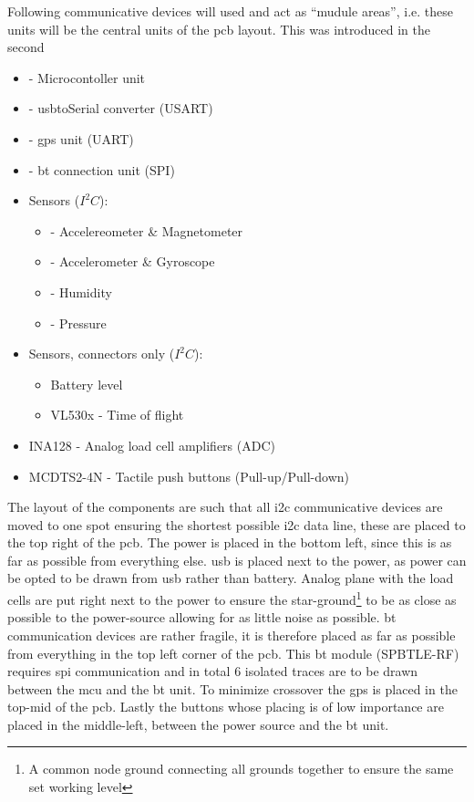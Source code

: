 Following communicative devices will used and act as ``mudule areas'', i.e. these units will be the central units of the \gls{pcb} layout. This was introduced in the second
\begin{itemize}[noitemsep]
\item{ - Microcontoller unit}
\item{ - \gls{usb}toSerial converter (USART)}
\item{ - \gls{gps} unit (UART)}
\item{ - \gls{bt} connection unit (SPI)}
\item Sensors ($I^2C$):
	\begin{itemize}[noitemsep]
	\item{ - Accelereometer \& Magnetometer}
	\item{ - Accelerometer \& Gyroscope}
	\item{ - Humidity}
	\item{ - Pressure}
	\end{itemize}
\item Sensors, connectors only ($I^2C$):
	\begin{itemize}[noitemsep]
	\item Battery level
	\item VL530x \qquad- Time of flight
	\end{itemize}
\item INA128 \qquad- Analog load cell amplifiers (ADC)
\item MCDTS2-4N \qquad- Tactile push buttons (Pull-up/Pull-down)
\end{itemize}
The layout of the components are such that all \gls{i2c} communicative devices are moved to one spot ensuring the shortest possible \gls{i2c} data line, these are placed to the top right of the \gls{pcb}. The power is placed in the bottom left, since this is as far as possible from everything else. \gls{usb} is placed next to the power, as power can be opted to be drawn from \gls{usb} rather than battery. Analog plane with the load cells are put right next to the power to ensure the star-ground\footnote{A common node ground connecting all grounds together to ensure the same set working level} to be as close as possible to the power-source allowing for as little noise as possible. \gls{bt} communication devices are rather fragile, it is therefore placed as far as possible from everything in the top left corner of the \gls{pcb}. This \gls{bt} module (SPBTLE-RF) requires \gls{spi} communication and in total $6$ isolated traces are to be drawn between the \gls{mcu} and the \gls{bt} unit. To minimize crossover the \gls{gps} is placed in the top-mid of the \gls{pcb}. Lastly the buttons whose placing is of low importance are placed in the middle-left, between the power source and the \gls{bt} unit. 
